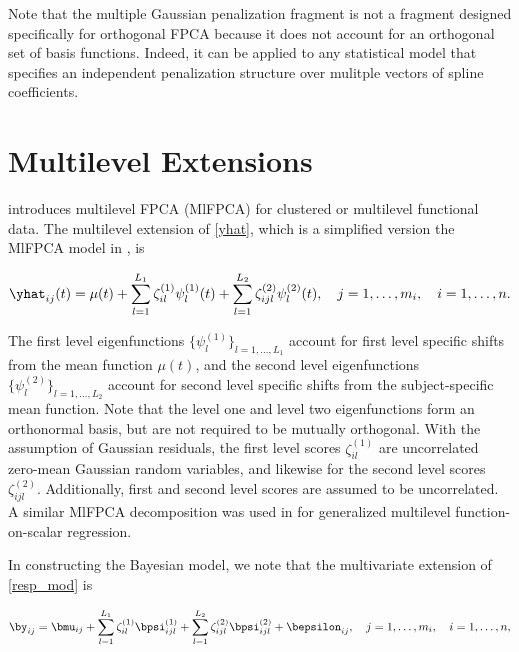 \documentclass[ba]{imsart}
\numberwithin{equation}{section}
\theoremstyle{plain}
\newcommand\zetaL[2]{\zeta^{(#1)}_{#2}}
\newcommand\psiL[2]{\psi^{(#1)}_{#2}}
\newcommand\bpsiL[2]{\bpsi^{(#1)}_{#2}}
\begin{document}
Note that the multiple Gaussian penalization fragment is not a fragment designed specifically for
orthogonal FPCA because it
does not account for an orthogonal set of basis functions. Indeed, it can be applied to any statistical
model that specifies an independent penalization structure over mulitple vectors of spline coefficients.


\section{Multilevel Extensions}
\label{sec:mlfpca}

\citet{di09} introduces multilevel FPCA (MlFPCA) for clustered or multilevel functional data. The multilevel
extension of \eqref{yhat}, which is a simplified version the MlFPCA model in \citet{di09}, is

\begin{equation}
	\yhat_{ij} (t) =
		\mu (t) + \sum_{l = 1}^{L_1} \zetaL{1}{il} \psiL{1}{l} (t)
		+ \sum_{l = 1}^{L_2} \zetaL{2}{ijl} \psiL{2}{l} (t),
	\quad j = 1, \dots, m_i, \quad i = 1, \dots, n.
\label{yhatml}
\end{equation}

\noindent The first level eigenfunctions $\{ \psiL{1}{l} \}_{l = 1, \dots, L_1}$ account for first level specific
shifts from the mean function $\mu (t)$, and the second level eigenfunctions $\{ \psiL{2}{l} \}_{l = 1, \dots, L_2}$
account for second level specific shifts from the subject-specific mean function.
Note that the level one and level two eigenfunctions form an orthonormal
basis, but are not required to be mutually orthogonal. With the assumption of Gaussian residuals, the first level
scores $\zetaL{1}{il}$ are uncorrelated zero-mean Gaussian random variables, and likewise for the second
level scores $\zetaL{2}{ijl}$. Additionally, first and second level scores are assumed to be uncorrelated.
A similar MlFPCA decomposition was used in \citet{Goldsmith15} for generalized multilevel
function-on-scalar regression.

In constructing the Bayesian model, we note that the multivariate extension of \eqref{resp_mod} is

\[
	\by_{ij} =
		\bmu_{ij} + \sum_{l=1}^{L_1} \zetaL{1}{il} \bpsiL{1}{ijl}
		+ \sum_{l=1}^{L_2} \zetaL{2}{ijl} \bpsiL{2}{ijl} + \bepsilon_{ij},
	\quad j = 1, \dots, m_i, \quad i = 1, \dots, n,
\]
\end{document}
